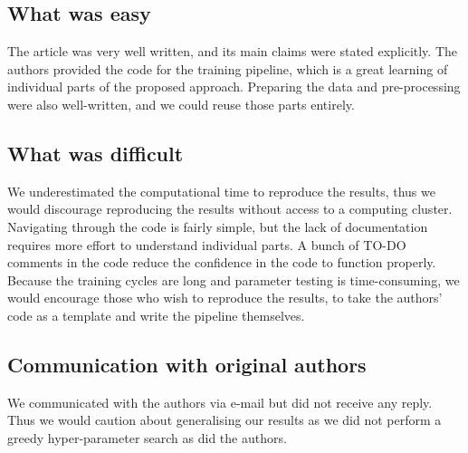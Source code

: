 \subsection{What was easy}


The article was very well written, and its main claims were stated explicitly. The authors provided the code for the training pipeline, which is a great learning of individual parts of the proposed approach.
Preparing the data and pre-processing were also well-written, and we could reuse those parts entirely.

\subsection{What was difficult}


We underestimated the computational time to reproduce the results, thus we would discourage reproducing the results without access to a computing cluster. Navigating through the code is fairly simple, but the lack of documentation requires more effort to understand individual parts. A bunch of TO-DO comments in the code reduce the confidence in the code to function properly.
Because the training cycles are long and parameter testing is time-consuming, we would encourage those who wish to reproduce the results, to take the authors' code as a template and write the pipeline themselves.

\subsection{Communication with original authors}
We communicated with the authors via e-mail but did not receive any reply. Thus we would caution about generalising our results as we did not perform a greedy hyper-parameter search as did the authors.

